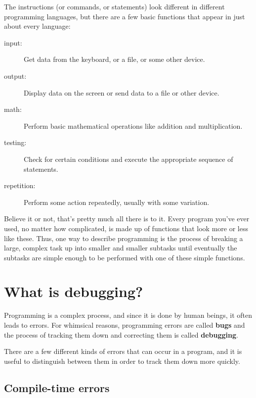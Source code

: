 
The instructions (or commands, or statements) look different in
different programming languages, but there are a few basic functions
that appear in just about every language:

\begin{description}

\item[input:] Get data from the keyboard, or a file, or some
other device.

\item[output:] Display data on the screen or send data to a
file or other device.

\item[math:] Perform basic mathematical operations like addition and
multiplication.

\item[testing:] Check for certain conditions and execute the
appropriate sequence of statements.

\item[repetition:] Perform some action repeatedly, usually with
some variation.

\end{description}

Believe it or not, that's pretty much all there is to it.
Every program you've ever used, no matter how complicated, is
made up of functions that look more or less like these.  Thus,
one way to describe programming is the process of breaking a
large, complex task up into smaller and smaller subtasks
until eventually the subtasks are simple enough to be performed
with one of these simple functions.

\section{What is debugging?}

Programming is a complex process, and since it is done by
human beings, it often leads to errors.  For whimsical reasons,
programming errors are called {\bf bugs} and the process
of tracking them down and correcting them is called
{\bf debugging}.

There are a few different kinds of errors that can occur
in a program, and it is useful to distinguish between them
in order to track them down more quickly.

\subsection{Compile-time errors}

